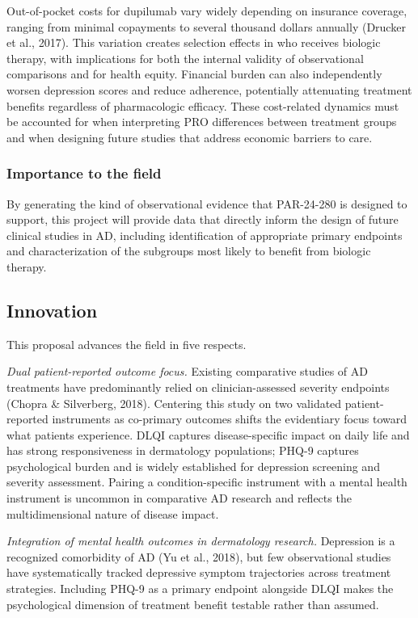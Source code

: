 \documentclass[
]{agujournal2019}
\begin{document}
Out-of-pocket costs for dupilumab vary widely depending on insurance
coverage, ranging from minimal copayments to several thousand dollars
annually (Drucker et al., 2017). This variation creates selection
effects in who receives biologic therapy, with implications for both the
internal validity of observational comparisons and for health equity.
Financial burden can also independently worsen depression scores and
reduce adherence, potentially attenuating treatment benefits regardless
of pharmacologic efficacy. These cost-related dynamics must be accounted
for when interpreting PRO differences between treatment groups and when
designing future studies that address economic barriers to care.

\subsubsection{Importance to the field}\label{importance-to-the-field}

By generating the kind of observational evidence that PAR-24-280 is
designed to support, this project will provide data that directly inform
the design of future clinical studies in AD, including identification of
appropriate primary endpoints and characterization of the subgroups most
likely to benefit from biologic therapy.

\subsection{Innovation}\label{innovation}

This proposal advances the field in five respects.

\emph{Dual patient-reported outcome focus.} Existing comparative studies
of AD treatments have predominantly relied on clinician-assessed
severity endpoints (Chopra \& Silverberg, 2018). Centering this study on
two validated patient-reported instruments as co-primary outcomes shifts
the evidentiary focus toward what patients experience. DLQI captures
disease-specific impact on daily life and has strong responsiveness in
dermatology populations; PHQ-9 captures psychological burden and is
widely established for depression screening and severity assessment.
Pairing a condition-specific instrument with a mental health instrument
is uncommon in comparative AD research and reflects the multidimensional
nature of disease impact.

\emph{Integration of mental health outcomes in dermatology research.}
Depression is a recognized comorbidity of AD (Yu et al., 2018), but few
observational studies have systematically tracked depressive symptom
trajectories across treatment strategies. Including PHQ-9 as a primary
endpoint alongside DLQI makes the psychological dimension of treatment
benefit testable rather than assumed.
\end{document}
